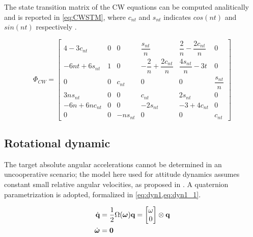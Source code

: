 The state transition matrix of the CW equations can be computed analitically and is reported in \cref{eq:CWSTM}, where $c_{nt}$ and $s_{nt}$ indicates $cos(nt)$ and $sin(nt)$ respectively \cite{alfriend2009spacecraft}.
\begingroup

\begin{equation}
\label{eq:CWSTM}
\Phi_{CW} = \begin{bmatrix}
4-3c_{nt} & 0 & 0 &\dfrac{s_{nt}}{n} & \dfrac{2}{n}-\dfrac{2c_{nt}}{n} & 0\\[0.5em]
-6nt+6s_{nt} & 1 & 0 & -\dfrac{2}{n}+\dfrac{2c_{nt}}{n} & \dfrac{4s_{nt}}{n}-3t & 0\\[0.5em]
0 & 0 & c_{nt} & 0& 0& \dfrac{s_{nt}}{n}\\[0.5em]
3ns_{nt} & 0 & 0 & c_{nt} & 2s_{nt} & 0 \\[0.5em]
-6n+6nc_{nt} & 0 & 0 & -2s_{nt} & -3+4c_{nt} & 0 \\[0.5em]
0 & 0 & -ns_{nt} & 0 & 0 & c_{nt}
\end{bmatrix}
\end{equation}
\endgroup
\subsection{Rotational dynamic}
The target absolute angular accelerations cannot be determined in an uncooperative scenario; the model here used for attitude dynamics assumes constant small relative angular velocities, as proposed in \cite{sharma2017reduced, geyer2021relative}. A quaternion parametrization is adopted, formalized in \cref{eq:dyn1,eq:dyn1_1}.

\begingroup
\renewcommand{\arraystretch}{0.8}
    
    \begin{align}
    \label{eq:dyn1}
        \dot{\mathrm{\textbf{q}}} &=\frac{1}{2}\Omega(\boldsymbol{\omega}) \mathrm{\textbf{q}} = \begin{bmatrix}
            \omega \\ 0
        \end{bmatrix} \otimes \mathrm{\textbf{q}}\\\label{eq:dyn1_1}
        \dot{\boldsymbol{\omega}}&= \mathrm{\textbf{0}}
    \end{align}
\endgroup

